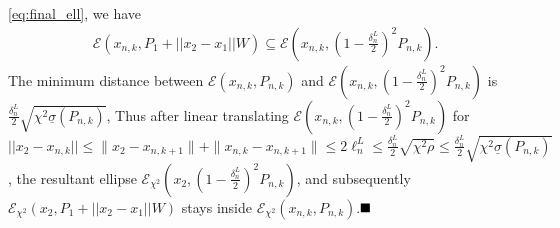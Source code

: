 \documentclass[Afour,sageh,times]{sagej}
\renewcommand{\qed}{\hfill\blacksquare}
\begin{document}
\eqref{eq:final_ell}, we have
\begin{align*}
&\mathcal{E}(x_{n,k}, P_1+||x_2-x_1||W)
\subseteq \mathcal{E}\left(x_{n,k},  \left(1-\frac{\delta^L_n}{2}\right)^2 P_{n,k}\right). 
\end{align*}
The minimum distance between $\mathcal{E}(x_{n,k}, P_{n,k})$ and $\mathcal{E}\left(x_{n,k},  \left(1-\frac{\delta^L_n}{2}\right)^2 P_{n,k}\right)$ is  
$\frac{\delta^L_n}{2}\sqrt{\chi^2\underline{\sigma}(P_{n,k})}$, Thus after linear translating $\mathcal{E}\left(x_{n,k},  \left(1-\frac{\delta^L_n}{2}\right)^2 P_{n,k}\right)$  for  
$||x_2-x_{n,k}||\leq \|x_2-x_{n,k+1}\|+\|x_{n,k}-x_{n,k+1}\| \leq 2\ell^L_n \leq \frac{\delta^L_n}{2} \sqrt{\chi^2\rho} \leq \frac{\delta^L_n}{2}\sqrt{\chi^2 \underline{\sigma}(P_{n,k})}$, the resultant ellipse $\mathcal{E}_{\chi^2}(x_2, 
\left(1-\frac{\delta^L_n}{2}\right)^2 P_{n,k})$, and subsequently $\mathcal{E}_{\chi^2}\left(x_2, P_1+||x_2-x_1||W\right)$ stays inside 
$\mathcal{E}_{\chi^2} \left(x_{n,k},P_{n,k}\right)$.$\qed$
\end{document}
